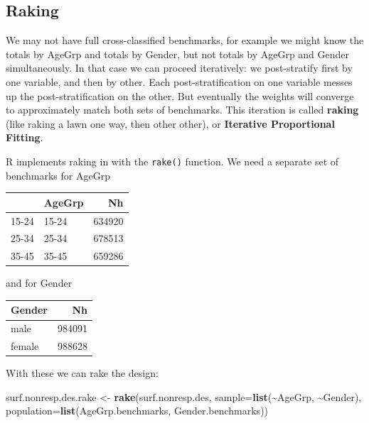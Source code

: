 \documentclass[
]{book}
\newenvironment{Shaded}{\begin{snugshade}}{\end{snugshade}}
\newcommand{\AttributeTok}[1]{\textcolor[rgb]{0.13,0.29,0.53}{#1}}
\newcommand{\FunctionTok}[1]{\textcolor[rgb]{0.13,0.29,0.53}{\textbf{#1}}}
\newcommand{\NormalTok}[1]{#1}
\newcommand{\OtherTok}[1]{\textcolor[rgb]{0.56,0.35,0.01}{#1}}
\newcommand{\SpecialCharTok}[1]{\textcolor[rgb]{0.81,0.36,0.00}{\textbf{#1}}}
\begin{document}
\subsection*{Raking}\label{raking}

We may not have full cross-classified benchmarks, for example we might know the
totals by AgeGrp and totals by Gender, but not totals by AgeGrp and Gender simultaneously.
In that case we can proceed iteratively: we post-stratify first by one variable, and
then by other. Each post-stratification on one variable messes up the post-stratification
on the other. But eventually the weights will converge to approximately match both sets
of benchmarks. This iteration is called \textbf{raking} (like raking a lawn one way, then other other),
or \textbf{Iterative Proportional Fitting}.

R implements raking in with the \texttt{rake()} function. We need a separate set of benchmarks
for AgeGrp

\begin{table}
\centering
\begin{tabular}[t]{l|l|r}
\hline
  & AgeGrp & Nh\\
\hline
15-24 & 15-24 & 634920\\
\hline
25-34 & 25-34 & 678513\\
\hline
35-45 & 35-45 & 659286\\
\hline
\end{tabular}
\end{table}

and for Gender

\begin{table}
\centering
\begin{tabular}[t]{l|r}
\hline
Gender & Nh\\
\hline
male & 984091\\
\hline
female & 988628\\
\hline
\end{tabular}
\end{table}

With these we can rake the design:

\begin{Shaded}
\begin{Highlighting}[]
\NormalTok{surf.nonresp.des.rake }\OtherTok{\textless{}{-}} \FunctionTok{rake}\NormalTok{(surf.nonresp.des, }
                              \AttributeTok{sample=}\FunctionTok{list}\NormalTok{(}\SpecialCharTok{\textasciitilde{}}\NormalTok{AgeGrp, }\SpecialCharTok{\textasciitilde{}}\NormalTok{Gender), }
                              \AttributeTok{population=}\FunctionTok{list}\NormalTok{(AgeGrp.benchmarks, Gender.benchmarks))}
\end{Highlighting}
\end{Shaded}
\end{document}
